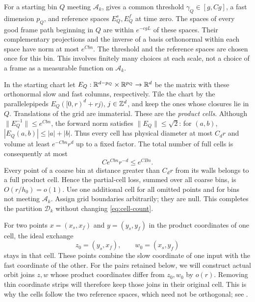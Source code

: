 For a starting bin $Q$ meeting $\mathcal A_k$, 
gives a common threshold $\gamma_Q\in[g,Cg]$, a fast dimension $p_Q$,
and reference spaces $E_Q^s,E_Q^f$ at time zero.  The spaces of every
good frame path beginning in $Q$ are within $e^{-cgL}$ of these spaces.
Their complementary projections and the inverse of a basis orthonormal
within each space have norm at most $e^{Cbn}$.  The threshold and the
reference spaces are chosen once for this bin.  This involves finitely
many choices at each scale, not a choice of a frame as a measurable
function on $\mathcal A_k$.

In the starting chart let $E_Q:\mathbb R^{d-p_Q}\times\mathbb R^{p_Q}\to\mathbb R^d$
be the matrix with these orthonormal slow and fast columns, respectively.
Tile the chart by the parallelepipeds $E_Q([0,r)^d+rj)$, $j\in\mathbb Z^d$,
and keep the ones whose closures lie in $Q$.  Translations of the grid
are immaterial.  These are the \emph{product cells}.  Although
$\|E_Q^{-1}\|\le e^{Cbn}$, the forward norm satisfies
$\|E_Q\|\le\sqrt2$: for $(a,b)$,
$|E_Q(a,b)|\le |a|+|b|$.  Thus every cell has physical diameter at
most $C_dr$ and volume at least $e^{-Cbn}r^d$ up to a fixed factor.
The total number of full cells is consequently at most
\begin{equation}\label{eq:cell-count}
 C e^{Cbn}r^{-d}\le e^{CBn}.
\end{equation}
Every point of a coarse bin at distance greater than $C_dr$ from its
walls belongs to a full product cell.  Hence the partial-cell loss,
summed over all coarse bins, is $O(r/h_0)=o(1)$.
Use one additional cell for all omitted points and for bins not meeting
$\mathcal A_k$.  Assign grid boundaries arbitrarily; they are null.
This completes the partition $\mathcal D_k$ without changing
\eqref{eq:cell-count}.

For two points $x=(x_s,x_f)$ and $y=(y_s,y_f)$ in the product
coordinates of one cell, the ideal exchange
\[
 z_0=(y_s,x_f),\qquad w_0=(x_s,y_f)
\]
stays in that cell.  These points combine the slow coordinate of one
input with the fast coordinate of the other.  For the pairs retained
below, we will construct actual orbit joins $z,w$ whose product
coordinates differ from $z_0,w_0$ by $o(r)$.
Removing thin coordinate strips will therefore keep those
joins in their original cell.  This is why the cells follow the two
reference spaces, which need not be orthogonal; see
.

